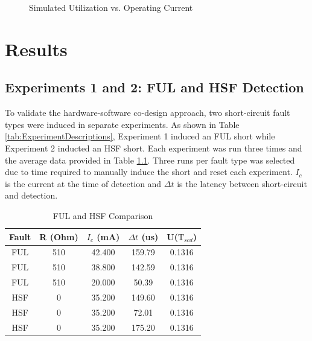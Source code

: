 \documentclass[11pt,compsoc,oneside]{report}
\begin{document}
\begin{figure}
\centering
{}
    \caption{Simulated Utilization vs. Operating Current}
    \label{fig:Simulated Utilization}
\end{figure}
\chapter{Results}\label{chap:results}
\section{Experiments 1 and 2: FUL and HSF Detection}
To validate the hardware-software co-design approach, two short-circuit fault types were induced in separate experiments. As shown in Table \ref{tab:ExperimentDescriptions}, Experiment 1 induced an FUL short while Experiment 2 inducted an HSF short. Each experiment was run three times and the average data provided in Table \ref{tab:FULHSFComparison}. Three runs per fault type was selected due to time required to manually induce the short and reset each experiment. $I_{c}$ is the current at the time of detection and $\Delta t$ is the latency between short-circuit and detection.

\begin{table}
	\centering
	\bgroup
	\def\arraystretch{1.25}%
	\begin{tabular}{| c | c | c | c | c |}
  		\hline			
  		Fault & R (Ohm) & $I_{c}$ (mA) & $\Delta t$ (us) & U($\mathrm{T}_{scd}$)\\ \hline \hline \cline{1-5}
		FUL & 510 & 42.400 & 159.79 & 0.1316\\ \hline
		FUL & 510 & 38.800 & 142.59 & 0.1316\\	\hline
		FUL & 510 & 20.000 &  50.39 & 0.1316\\	\hline
		HSF &   0 & 35.200 & 149.60 & 0.1316\\	\hline
		HSF &   0 & 35.200 &  72.01 & 0.1316\\	\hline
		HSF &   0 & 35.200 & 175.20 & 0.1316\\	\hline
  	\end{tabular}
	\egroup
    \caption{FUL and HSF Comparison}
    \label{tab:FULHSFComparison}
\end{table}
\end{document}
